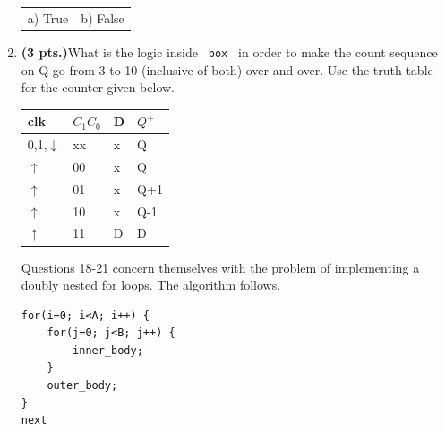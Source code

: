 \documentclass{article}
\begin{document}
\begin{enumerate}
\begin{tabular}{p{1.75in}p{1.75in}}
a) True & b) False \\
\end{tabular}

\item {\bf (3 pts.)}What is the logic inside \verb+ box + in order
to make the count sequence on Q go from 3 to 10 (inclusive of both)
over and over.  Use the truth table for the counter given below.






\begin{tabular}{l|l|l||l}
clk             & $C_1 C_0$     & D & $Q^+$     \\ \hline
0,1,$\downarrow$& xx            & x & Q         \\ \hline
$\uparrow$      & 00            & x & Q         \\  \hline
$\uparrow$      & 01            & x & Q+1       \\  \hline
$\uparrow$      & 10            & x & Q-1       \\  \hline
$\uparrow$      & 11            & D & D         \\
\end{tabular} 



\pagebreak
Questions 18-21 concern themselves with the problem of 
implementing a doubly nested for loops.  The algorithm
follows.


\begin{verbatim}
for(i=0; i<A; i++) {
    for(j=0; j<B; j++) {
        inner_body;
    }
    outer_body;
}
next
\end{verbatim}


\end{enumerate}
\end{document}
